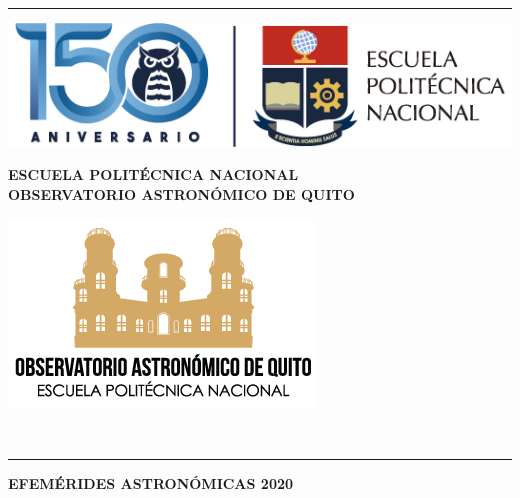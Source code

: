 \documentclass[12pt,a4paper,oneside]{article}
\begin{document}
\rule[1mm]{170mm}{0.20mm}
\begin{minipage}[d]{50mm}
\begin{center}
\includegraphics[scale=0.30]{epn.png}
\end{center}
\end{minipage}
\begin{minipage}[d]{90mm}
\begin{center}
\vspace{0.5cm}
\textsf{\textbf{ ESCUELA POLIT\'ECNICA NACIONAL}}\\
\textsf{\textbf{\small OBSERVATORIO ASTRONÓMICO DE QUITO}}\\
\end{center}
\end{minipage}
\begin{minipage}[d]{30mm}
\begin{center}
\includegraphics[scale=.25]{logo.png}
\end{center}
\end{minipage}\\
\rule[1mm]{170mm}{0.20mm}
\begin{center}
\textbf{\huge EFEM\'ERIDES ASTRON\'OMICAS 2020 \\}
\end{center}
\end{document}
